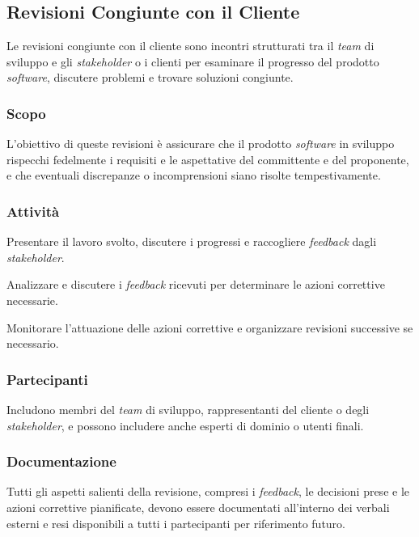 \subsection{Revisioni Congiunte con il Cliente}

Le revisioni congiunte con il cliente sono incontri strutturati tra il \textit{team} di
sviluppo e gli \textit{stakeholder} o i clienti per esaminare il progresso del
prodotto \textit{software}, discutere problemi e trovare soluzioni congiunte.

\subsubsection{Scopo}
L'obiettivo di queste revisioni è assicurare che il prodotto \textit{software}
in sviluppo rispecchi fedelmente i requisiti e le aspettative del committente e
del proponente, e che eventuali discrepanze o incomprensioni siano risolte
tempestivamente.

\subsubsection{Attività}
Presentare il lavoro svolto,
	  discutere i progressi e raccogliere \textit{feedback\g} dagli
	  \textit{stakeholder}.



Analizzare e discutere i
	  \textit{feedback\g} ricevuti per determinare le azioni correttive
	  necessarie.



Monitorare l'attuazione delle azioni
	  correttive e organizzare revisioni successive se necessario.

\subsubsection{Partecipanti}
Includono membri del \textit{team} di sviluppo, rappresentanti del cliente o degli
\textit{stakeholder}, e possono includere anche esperti di dominio o utenti
finali.

\subsubsection{Documentazione}
Tutti gli aspetti salienti della revisione, compresi i \textit{feedback\g}, le
decisioni prese e le azioni correttive pianificate, devono essere documentati
all'interno dei verbali esterni e resi disponibili a tutti i partecipanti per
riferimento futuro.
